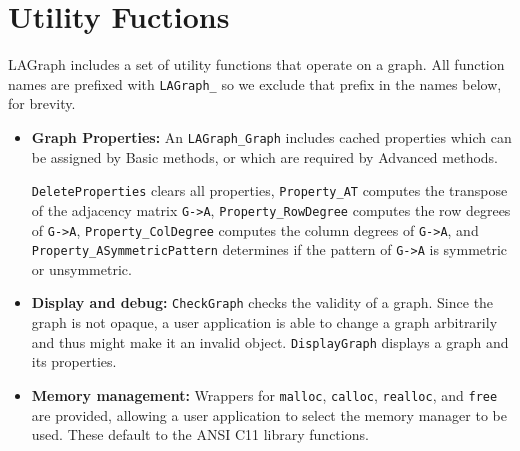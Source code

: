 \section{Utility Fuctions}
\label{sec:utility}

LAGraph includes a set of utility functions that operate
on a graph.  All function names are prefixed with \verb'LAGraph_'
so we exclude that prefix in the names below, for brevity.

\begin{itemize}

\item {\bf Graph Properties:}
    An \verb'LAGraph_Graph' includes cached properties which can be
    assigned by Basic methods, or which are required by Advanced methods.

      \verb'DeleteProperties' clears all properties,
      \verb'Property_AT' computes the transpose of the adjacency matrix \verb'G->A',
      \verb'Property_RowDegree' computes the row degrees of \verb'G->A',
      \verb'Property_ColDegree' computes the column degrees of \verb'G->A',
      and
      \verb'Property_ASymmetricPattern' determines if the pattern of \verb'G->A' is symmetric or unsymmetric.

\item {\bf Display and debug:}
    \verb'CheckGraph' checks the validity of a graph.
    Since the graph is not opaque, a user application is able to change a graph
    arbitrarily and thus might make it an invalid object.
    \verb'DisplayGraph' displays a graph and its properties.

\item {\bf Memory management:}
    Wrappers for \verb'malloc', \verb'calloc', \verb'realloc', and \verb'free' are provided,
    allowing a user application to select the memory manager to be used.
    These default to the ANSI C11 library functions.


\end{itemize}
